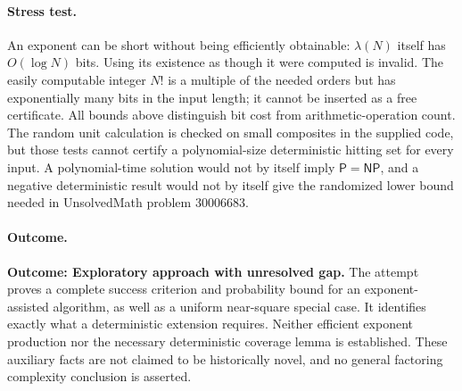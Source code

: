 \documentclass[11pt,a4paper]{article}
\begin{document}
\paragraph{Stress test.}
An exponent can be short without being efficiently obtainable:
$\lambda(N)$ itself has $O(\log N)$ bits. Using its existence as though
it were computed is invalid. The easily computable integer $N!$ is a
multiple of the needed orders but has exponentially many bits in the
input length; it cannot be inserted as a free certificate. All bounds
above distinguish bit cost from arithmetic-operation count. The random
unit calculation is checked on small composites in the supplied code,
but those tests cannot certify a polynomial-size deterministic hitting
set for every input. A polynomial-time solution would not by itself imply
$\mathsf P=\mathsf{NP}$, and a negative deterministic result would not
by itself give the randomized lower bound needed in UnsolvedMath problem 30006683.

\paragraph{Outcome.}
\textbf{Outcome: Exploratory approach with unresolved gap.}
The attempt proves a complete success criterion and probability bound for
an exponent-assisted algorithm, as well as a uniform near-square special
case. It identifies exactly what a deterministic extension requires.
Neither efficient exponent production nor the necessary deterministic
coverage lemma is established. These auxiliary facts are not claimed to
be historically novel, and no general factoring complexity conclusion is
asserted.
\end{document}
